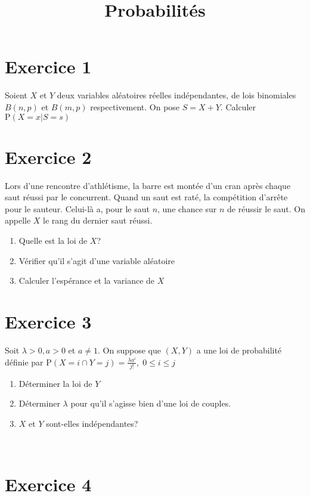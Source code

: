 \documentclass[11pt]{article}
\author{\Name \texttt{\Login}}
\date{}
\title{Probabilités}
\begin{document}
\maketitle

\section*{Exercice 1}

Soient $X$ et $Y$ deux variables aléatoires réelles indépendantes, de lois binomiales $B(n,p)$ et $B(m,p)$ respectivement. On pose $S=X+Y$. Calculer $\mathrm{P}(X=x|S=s)$

\section*{Exercice 2}

Lors d'une rencontre d'athlétisme, la barre est montée d'un cran après chaque saut réussi par le concurrent. Quand un saut est raté, la compétition d'arrête pour le sauteur. Celui-là a, pour le saut $n$, une chance sur $n$ de réussir le saut. On appelle $X$ le rang du dernier saut réussi. 

\begin{enumerate}
\item Quelle est la loi de $X$?
\item Vérifier qu'il s'agit d'une variable aléatoire
\item Calculer l'espérance et la variance de $X$ 
\end{enumerate}

\section*{Exercice 3}

Soit $\lambda>0, a>0$ et $a\neq1$. On suppose que $(X,Y)$ a une loi de probabilité définie par $\mathrm{P}(X=i\cap Y=j)=\frac{\lambda a^i}{j!},\; 0\leq i\leq j$

\begin{enumerate}
\item Déterminer la loi de $Y$
\item Déterminer $\lambda$ pour qu'il s'agisse bien d'une loi de couples.
\item $X$ et $Y$ sont-elles indépendantes?
\end{enumerate}
~
\section*{Exercice 4}
\end{document}
